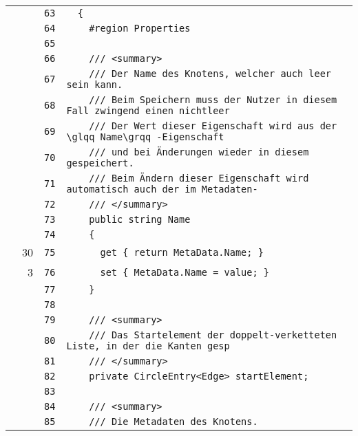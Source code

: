 \documentclass[a4paper,10pt]{article}
\begin{document}
\begin{longtable}[l]{lrrl}
\cellcolor{gray} &  & \verb~63~ & \verb~  {~\\
\cellcolor{gray} &  & \verb~64~ & \verb~    #region Properties~\\
\cellcolor{gray} &  & \verb~65~ & \verb~~\\
\cellcolor{gray} &  & \verb~66~ & \verb~    /// <summary>~\\
\cellcolor{gray} &  & \verb~67~ & \verb~    /// Der Name des Knotens, welcher auch leer sein kann.~\\
\cellcolor{gray} &  & \verb~68~ & \verb~    /// Beim Speichern muss der Nutzer in diesem Fall zwingend einen nichtleer~\\
\cellcolor{gray} &  & \verb~69~ & \verb~    /// Der Wert dieser Eigenschaft wird aus der \glqq Name\grqq -Eigenschaft ~\\
\cellcolor{gray} &  & \verb~70~ & \verb~    /// und bei Änderungen wieder in diesem gespeichert.~\\
\cellcolor{gray} &  & \verb~71~ & \verb~    /// Beim Ändern dieser Eigenschaft wird automatisch auch der im Metadaten-~\\
\cellcolor{gray} &  & \verb~72~ & \verb~    /// </summary>~\\
\cellcolor{gray} &  & \verb~73~ & \verb~    public string Name~\\
\cellcolor{gray} &  & \verb~74~ & \verb~    {~\\
\cellcolor{green} & 30 & \verb~75~ & \verb~      get { return MetaData.Name; }~\\
\cellcolor{green} & 3 & \verb~76~ & \verb~      set { MetaData.Name = value; }~\\
\cellcolor{gray} &  & \verb~77~ & \verb~    }~\\
\cellcolor{gray} &  & \verb~78~ & \verb~~\\
\cellcolor{gray} &  & \verb~79~ & \verb~    /// <summary>~\\
\cellcolor{gray} &  & \verb~80~ & \verb~    /// Das Startelement der doppelt-verketteten Liste, in der die Kanten gesp~\\
\cellcolor{gray} &  & \verb~81~ & \verb~    /// </summary>~\\
\cellcolor{gray} &  & \verb~82~ & \verb~    private CircleEntry<Edge> startElement;~\\
\cellcolor{gray} &  & \verb~83~ & \verb~~\\
\cellcolor{gray} &  & \verb~84~ & \verb~    /// <summary>~\\
\cellcolor{gray} &  & \verb~85~ & \verb~    /// Die Metadaten des Knotens.~\\

\end{longtable}
\end{document}
